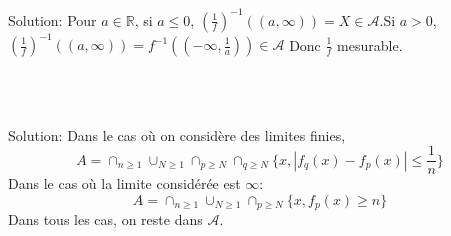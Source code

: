 \documentclass{report}
\begin{document}
Solution: Pour $a\in \mathbb R$, si $a\leq 0$, $(\frac{1}{f})^{-1}((a,\infty)) = X\in \mathcal A$.\newline Si $a>0$,  $(\frac{1}{f})^{-1}((a,\infty)) = {f}^{-1}((-\infty,\frac 1a))\in \mathcal A$\newline
Donc $\frac 1f$ mesurable.

\subsection{}  \\ \\

Solution: Dans le cas où on considère des limites finies, $$A=\cap_{n \geq 1} \cup_{N\geq 1} \cap_{p\geq N} \cap_{q\geq N} \{x, \left| f_q(x)-f_p(x)\right|\leq \frac 1n\}$$
Dans le cas où la limite considérée est $\infty$: $$A=\cap_{n\geq 1} \cup_{N\geq 1} \cap_{p\geq N} \{x, f_p(x)\geq n\}$$
Dans tous les cas, on reste dans $\mathcal A$.

\newpage
\subsection{} \\\\
\end{document}
